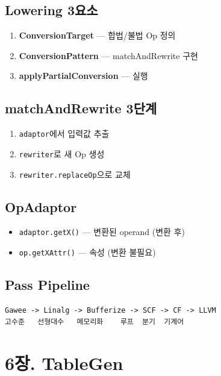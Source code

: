 \documentclass[11pt,a4paper]{article}
\begin{document}
\subsection{Lowering 3요소}
\begin{enumerate}[nosep]
\item \textbf{ConversionTarget} --- 합법/불법 Op 정의
\item \textbf{ConversionPattern} --- matchAndRewrite 구현
\item \textbf{applyPartialConversion} --- 실행
\end{enumerate}

\subsection{matchAndRewrite 3단계}
\begin{enumerate}[nosep]
\item \texttt{adaptor}에서 입력값 추출
\item \texttt{rewriter}로 새 Op 생성
\item \texttt{rewriter.replaceOp}으로 교체
\end{enumerate}

\subsection{OpAdaptor}
\begin{itemize}[nosep]
\item \texttt{adaptor.getX()} --- 변환된 operand (변환 후)
\item \texttt{op.getXAttr()} --- 속성 (변환 불필요)
\end{itemize}

\subsection{Pass Pipeline}
\begin{lstlisting}
Gawee -> Linalg -> Bufferize -> SCF -> CF -> LLVM
고수준   선형대수   메모리화    루프  분기  기계어
\end{lstlisting}

\newpage

\section{6장. TableGen}
\end{document}
